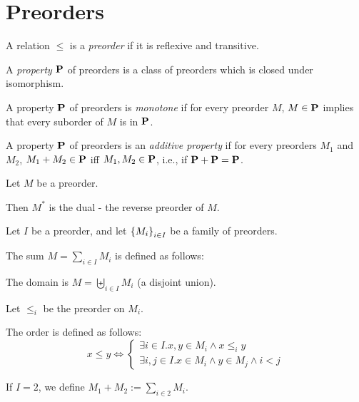 \section{Preorders}

\begin{definition}[Preorder]
  A relation $\le$ is a \emph{preorder} if it is reflexive and transitive.
\end{definition}

\begin{definition}
  A \emph{property} $\mathbf{P}$ of preorders is a class of preorders which
  is closed under isomorphism.
\end{definition}

\begin{definition}
  A property $\mathbf{P}$ of preorders is \emph{monotone} if for every preorder $M$,
  $M \in \mathbf{P}$ implies that every suborder of $M$ is in $\mathbf{P}$.
\end{definition}

\begin{definition}
  A property $\mathbf{P}$ of preorders is an \emph{additive property} if for every preorders $M_1$ and $M_2$,
  $M_1 + M_2 \in \mathbf{P}$ iff $M_1, M_2 \in \mathbf{P}$, i.e., if $\mathbf{P} + \mathbf{P} = \mathbf{P}$.
\end{definition}

\begin{definition}
  Let $M$ be a preorder.

  Then $M^\ast$ is the dual - the reverse preorder of $M$.
\end{definition}

\begin{definition}
  Let $I$ be a preorder, and let $\left\{ {M_i} \right\}_{i \in I}$ be a family of preorders.

  The sum $M = \sum_{i \in I} M_i$ is defined as follows:

  The domain is $M = \biguplus_{i \in I} M_i$ (a disjoint union).

  Let $\le_i$ be the preorder on $M_i$.

  The order is defined as follows:
  \[
    x \le y \iff \begin{cases}
      \exists i \in I. x, y \in M_i \land x \le_i y \\
      \exists i, j \in I. x \in M_i \land y \in M_j \land i < j
    \end{cases}
  \]

  If $I = 2$, we define $M_1 + M_2 := \sum_{i \in 2} M_i$.
\end{definition}

